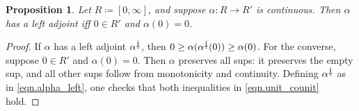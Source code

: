 \documentclass[11pt, one side, article]{memoir}
\newcommand{\adjpos}[6][30pt]{%
\begin{tikzcd}[ampersand replacement=\&, column sep=#1]
  #2\ar[r, shift left=4.5pt, "#3"]
  \ar[r, phantom, "\scriptstyle#6"]\&
  #5\ar[l, shift left=4.5pt, "#4"]
\end{tikzcd}
}
\theoremstyle{definition}
\theoremstyle{plain}
\newtheorem{proposition}[definitionx]{Proposition}
\newtheorem{lemma}[definitionx]{Lemma}
\DeclarePairedDelimiter{\floor}{\lfloor}{\rfloor}
\DeclarePairedDelimiter{\ceil}{\lceil}{\rceil}
\newcommand{\ldag}{^{\rotatebox{180}{$\dagger$}}}
\newcommand{\tn}[1]{\textnormal{#1}}
\newcommand{\blank}[1][1pt]{\hspace{#1}\cdot\hspace{#1}}
\newcommand{\hh}[2][]{#1 \tn{\textit{#2}} #1}
\newcommand{\qqand}{\hh[\qquad]{and}}
\newcommand{\flr}[2][\blank]{\floor{#1}_{#2}}
\newcommand{\clg}[2][\blank]{\ceil{#1}_{#2}}
\begin{document}
%

\begin{proposition}\label{prop.cts_adjoint_close}
Let $R\coloneqq [0,\infty]$, and suppose $\alpha\colon R\to R'$ is continuous. Then $\alpha$ has a left adjoint iff $0\in R'$ and $\alpha(0)=0$.
\end{proposition}
\begin{proof}
	If $\alpha$ has a left adjoint $\alpha\ldag$, then $0\geq\alpha(\alpha\ldag(0))\geq\alpha(0)$. For the converse, suppose $0\in R'$ and $\alpha(0)=0$. Then $\alpha$ preserves all sups: it preserves the empty sup, and all other sups follow from monotonicity and continuity. Defining $\alpha\ldag$ as in \eqref{eqn.alpha_left}, one checks that both inequalities in \eqref{eqn.unit_counit} hold.
\end{proof}
\end{document}
